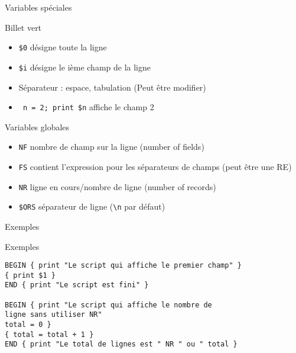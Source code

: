 \def\ftitle{Variables spéciales}
\begin{frame}[containsverbatim]{\ftitle}
\def\blocktitle{Billet vert}
\begin{block}{\blocktitle}
\begin{itemize}
\item \verb!$0! désigne toute la ligne
\item \verb!$i! désigne le ième champ de la ligne
\item Séparateur : espace, tabulation (Peut être modifier)
\item \verb! n = 2; print $n! affiche le champ 2%
\end{itemize}
\end{block}
\def\blocktitle{Variables globales}
\begin{block}{\blocktitle}
\begin{itemize}
\item \verb!NF! nombre de champ sur la ligne (number of fields)%
\item \verb!FS! contient l'expression pour les séparateurs de champs (peut être une RE)%
\item \verb!NR! ligne en cours/nombre de ligne (number of records)%
\item \verb!$ORS! séparateur de ligne (\verb!\n! par défaut)%
\end{itemize}
\end{block}
\end{frame}


\def\ftitle{Exemples}
\begin{frame}[containsverbatim]{\ftitle}
\def\blocktitle{Exemples}
\begin{block}{\blocktitle}
\begin{verbatim}
BEGIN { print "Le script qui affiche le premier champ" }
{ print $1 }
END { print "Le script est fini" }

BEGIN { print "Le script qui affiche le nombre de 
ligne sans utiliser NR"
total = 0 }
{ total = total + 1 }
END { print "Le total de lignes est " NR " ou " total }
\end{verbatim}%
\end{block}
\end{frame}

